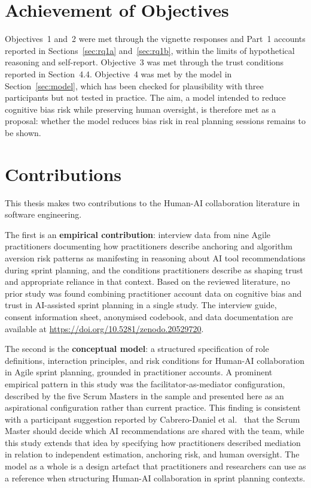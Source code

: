\documentclass[a4paper,twoside]{bth}
\begin{document}
\section{Achievement of Objectives}

Objectives~1 and~2 were met through the vignette responses and Part~1 accounts reported in Sections~\ref{sec:rq1a} and~\ref{sec:rq1b}, within the limits of hypothetical reasoning and self-report. Objective~3 was met through the trust conditions reported in Section~4.4. Objective~4 was met by the model in Section~\ref{sec:model}, which has been checked for plausibility with three participants but not tested in practice. The aim, a model intended to reduce cognitive bias risk while preserving human oversight, is therefore met as a proposal: whether the model reduces bias risk in real planning sessions remains to be shown.

\section{Contributions}

This thesis makes two contributions to the Human-AI collaboration literature in software engineering.

The first is an \textbf{empirical contribution}: interview data from nine Agile practitioners documenting how practitioners describe anchoring and algorithm aversion risk patterns as manifesting in reasoning about AI tool recommendations during sprint planning, and the conditions practitioners describe as shaping trust and appropriate reliance in that context. Based on the reviewed literature, no prior study was found combining practitioner account data on cognitive bias and trust in AI-assisted sprint planning in a single study. The interview guide, consent information sheet, anonymised codebook, and data documentation are available at \url{https://doi.org/10.5281/zenodo.20529720}.

The second is the \textbf{conceptual model}: a structured specification of role definitions, interaction principles, and risk conditions for Human-AI collaboration in Agile sprint planning, grounded in practitioner accounts. A prominent empirical pattern in this study was the facilitator-as-mediator configuration, described by the five Scrum Masters in the sample and presented here as an aspirational configuration rather than current practice. This finding is consistent with a participant suggestion reported by Cabrero-Daniel et al.~\cite{cabrero2024exploring} that the Scrum Master should decide which AI recommendations are shared with the team, while this study extends that idea by specifying how practitioners described mediation in relation to independent estimation, anchoring risk, and human oversight. The model as a whole is a design artefact that practitioners and researchers can use as a reference when structuring Human-AI collaboration in sprint planning contexts.
\end{document}
